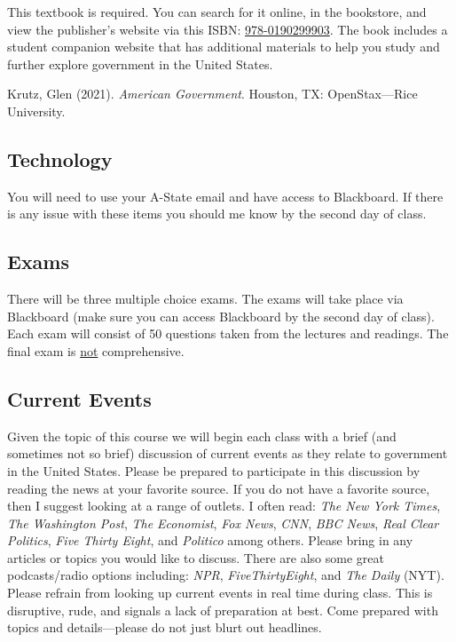 \documentclass[11pt,]{article}
\begin{document}
This textbook is required. You can search for it online, in the
bookstore, and view the publisher's website via this ISBN:
\href{http://global.oup.com/ushe/product/american-government-9780190299903}{978-0190299903}.
The book includes a student companion website that has additional
materials to help you study and further explore government in the United
States.

\hangindent=0.7cm

Krutz, Glen (2021). \emph{American Government}. Houston, TX:
OpenStax---Rice University.

\hypertarget{technology}{%
\subsection{Technology}\label{technology}}

You will need to use your A-State email and have access to Blackboard.
If there is any issue with these items you should me know by the second
day of class.

\hypertarget{exams}{%
\subsection{Exams}\label{exams}}

There will be three multiple choice exams. The exams will take place via
Blackboard (make sure you can access Blackboard by the second day of
class). Each exam will consist of 50 questions taken from the lectures
and readings. The final exam is \underline{not} comprehensive.

\hypertarget{current-events}{%
\subsection{Current Events}\label{current-events}}

Given the topic of this course we will begin each class with a brief
(and sometimes not so brief) discussion of current events as they relate
to government in the United States. Please be prepared to participate in
this discussion by reading the news at your favorite source. If you do
not have a favorite source, then I suggest looking at a range of
outlets. I often read: \emph{The New York Times}, \emph{The Washington
Post}, \emph{The Economist}, \emph{Fox News}, \emph{CNN}, \emph{BBC
News}, \emph{Real Clear Politics}, \emph{Five Thirty Eight}, and
\emph{Politico} among others. Please bring in any articles or topics you
would like to discuss. There are also some great podcasts/radio options
including: \emph{NPR}, \emph{FiveThirtyEight}, and \emph{The Daily}
(NYT). Please refrain from looking up current events in real time during
class. This is disruptive, rude, and signals a lack of preparation at
best. Come prepared with topics and details---please do not just blurt
out headlines.
\end{document}
